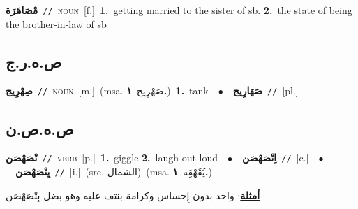 \documentclass[10pt,a4paper,twoside]{article} %
\begin{document}
\begin{multicols}{2}
{\setlength\topsep{0pt}\textbf{\foreignlanguage{arabic}{مْصَاهَرَة}}\ {\color{gray}\texttt{//}\color{black}}\ \textsc{noun}\ [f.]\ \textbf{1.}~getting married to the sister of sb.  \textbf{2.}~the state of being the brother-in-law of sb\ } \vspace{2mm}

\vspace{-3mm}
\subsection*{\color{blue}\foreignlanguage{arabic}{ص.ه.ر.ج}\color{blue}{}} 

{\setlength\topsep{0pt}\textbf{\foreignlanguage{arabic}{صِهْرِيج}}\ {\color{gray}\texttt{//}\color{black}}\ \textsc{noun}\ [m.]\ \color{gray}(msa. \foreignlanguage{arabic}{صَهْرِيج}~\foreignlanguage{arabic}{\textbf{١.}})\color{black}\ \textbf{1.}~tank\ \ $\bullet$\ \ \setlength\topsep{0pt}\textbf{\foreignlanguage{arabic}{صَهَارِيج}}\ {\color{gray}\texttt{//}\color{black}}\ [pl.]\ } \vspace{2mm}

\vspace{-3mm}
\subsection*{\color{blue}\foreignlanguage{arabic}{ص.ه.ص.ن}\color{blue}{}} 

{\setlength\topsep{0pt}\textbf{\foreignlanguage{arabic}{تْصَهْصَن}}\ {\color{gray}\texttt{//}\color{black}}\ \textsc{verb}\ [p.]\ \textbf{1.}~giggle  \textbf{2.}~laugh out loud\ \ $\bullet$\ \ \setlength\topsep{0pt}\textbf{\foreignlanguage{arabic}{اِتْصَهْصَن}}\ {\color{gray}\texttt{//}\color{black}}\ [c.]\ \ $\bullet$\ \ \setlength\topsep{0pt}\textbf{\foreignlanguage{arabic}{يِتْصَهْصَن}}\ {\color{gray}\texttt{//}\color{black}}\ [i.]\ (src. \color{gray}\foreignlanguage{arabic}{الشمال}\color{black})\ \color{gray}(msa. \foreignlanguage{arabic}{يُقَهْقِه}~\foreignlanguage{arabic}{\textbf{١.}})\color{black}\  \begin{flushright}\color{gray}\foreignlanguage{arabic}{\textbf{\underline{\foreignlanguage{arabic}{أمثلة}}}: واحد بدون إِحساس وكرامة بنتف عليه وهو بضل بِتْصَهْصَن}\end{flushright}\color{black}} \vspace{2mm}


\end{multicols}
\end{document}
